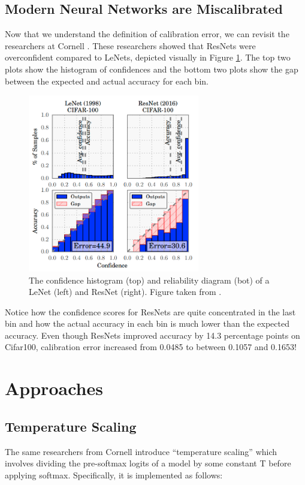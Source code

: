 \documentclass{article}
\begin{document}
\subsection{Modern Neural Networks are Miscalibrated}
Now that we understand the definition of calibration error, we can revisit the researchers at Cornell \cite{guo2017calibration}. These researchers showed that ResNets were overconfident compared to LeNets, depicted visually in Figure \ref{fig:modern}. The top two plots show the histogram of confidences and the bottom two plots show the gap between the expected and actual accuracy for each bin. 

\begin{figure}
    \centering
    \includegraphics[width=7.5cm]{images/modern.png}
    \caption{The confidence histogram (top) and reliability diagram (bot) of a LeNet (left) and ResNet (right). Figure taken from \cite{guo2017calibration}.}
    \label{fig:modern}
\end{figure}

Notice how the confidence scores for ResNets are quite concentrated in the last bin and how the actual accuracy in each bin is much lower than the expected accuracy. Even though ResNets improved accuracy by 14.3 percentage points on Cifar100, calibration error increased from 0.0485 to between 0.1057 and 0.1653!

\section{Approaches}
\subsection{Temperature Scaling}

The same researchers from Cornell introduce “temperature scaling” which involves dividing the pre-softmax logits of a model by some constant T before applying softmax. Specifically, it is implemented as follows:
\end{document}
